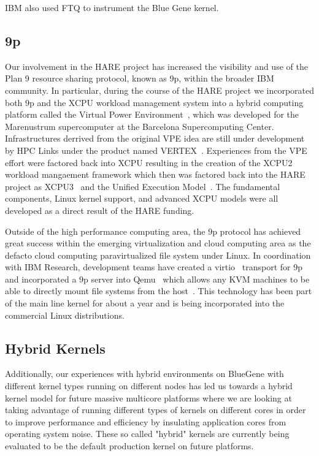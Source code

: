 IBM also used FTQ to instrument the Blue Gene kernel\cite{bgpftq}.

\subsection{9p}

Our involvement in the HARE project has increased the visibility and use
of the Plan 9 resource sharing protocol, known as 9p, within the broader IBM community.
In particular, during the course of the HARE project we incorporated both 9p and the XCPU
workload management system into a hybrid computing platform called the Virtual Power
Environment~\cite{VPE}, which was developed for the Marenustrum supercomputer at the Barcelona 
Supercomputing Center.  Infrastructures derrived from the original VPE idea are still
under development by HPC Links under the product named VERTEX~\cite{vertex}.
Experiences from the VPE effort were factored back into XCPU
resulting in the creation of the XCPU2~\cite{xcpu2} workload mangaement framework which then was
factored back into the HARE project as XCPU3~\cite{xcpu3} and the 
Unified Execution Model~\cite{uem}.  The fundamental components, Linux kernel support, and
advanced XCPU models were all developed as a direct result of the HARE funding.

Outside of the high performance computing area, the 9p protocol has achieved great success
within the emerging virtualization and cloud computing area as the defacto cloud computing
paravirtualized file system under Linux.  In coordination with IBM Research, development
teams have created a virtio~\cite{virtio} transport for 9p and incorporated a 9p server into
Qemu~\cite{qemu} which allows any KVM machines to be able to directly mount file systems
from the host~\cite{virtfs}.  This technology has been part of the main line kernel for about
a year and is being incorporated into the commercial Linux distributions.

\subsection{Hybrid Kernels}

Additionally, our experiences with hybrid environments on BlueGene with different kernel
types running on different nodes has led us towards a hybrid kernel model for future
massive multicore platforms where we are looking at taking advantage of running different
types of kernels on different cores in order to improve performance and efficiency by
insulating application cores from operating system noise.  These so called "hybrid" kernels
are currently being evaluated to be the default production kernel on future platforms.


